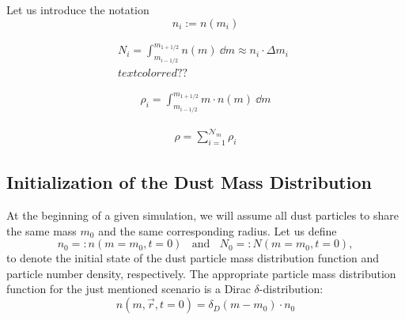 

    Let us introduce the notation
    \begin{equation}
        n_i:=n(m_i)
    \end{equation}

    \begin{align}
        N_i = \int_{m_{i-1/2}}^{m_{1+1/2}}n(m)\ \dd m \approx n_i \cdot \Delta m_i 
        \ \ \\textcolor{red}{??}
    \end{align}
    
    \begin{align}
        \label{eq:relationship_between_discretized_dust_particle_mass_distribution_and_mass_volume_density}
        \rho_i = \int_{m_{i-1/2}}^{m_{1+1/2}} m \cdot n(m)\ \dd m
    \end{align}
    
    \begin{align}
      \rho=\sum_{i=1}^{\mathcal N_m} \rho_i
    \end{align}

\clearpage\subsection{Initialization of the Dust Mass Distribution}

    At the beginning of a given simulation, we will assume all dust particles to share the same 
    mass $m_0$ and the same corresponding radius.
    Let us define 
    \begin{equation}
        n_0 =: n(m=m_0, t=0)
        \ \ \ \ \text{and}\ \ \ \
        N_0 =: N(m=m_0, t=0),
    \end{equation}
    to denote the initial state of the dust particle mass distribution function and particle
    number density, respectively. 
    The appropriate particle mass distribution function for the just mentioned scenario is a 
    Dirac $\delta$-distribution:
    \begin{equation}
        n(m, \vec r, t=0) = \delta_D(m-m_0) \cdot n_0  
    \end{equation}

